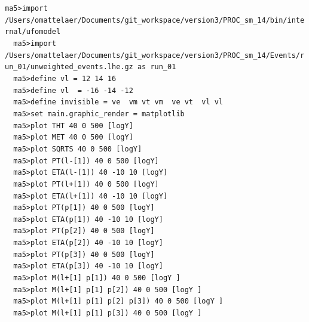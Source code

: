 \documentclass[a4paper, 10pt]{article}
\begin{document}
\texttt{ma5>import /\-Users/\-omattelaer/\-Documents/\-git\_workspace/\-version3/\-PROC\_sm\_14/\-bin/\-internal/\-ufomodel\\
}
\texttt{ }\texttt{ }\texttt{ma5>import /\-Users/\-omattelaer/\-Documents/\-git\_workspace/\-version3/\-PROC\_sm\_14/\-Events/\-run\_01/\-unweighted\_events.lhe.gz as run\_01\\
}
\texttt{ }\texttt{ }\texttt{ma5>define vl = 12 14 16\\
}
\texttt{ }\texttt{ }\texttt{ma5>define vl~ = -16 -14 -12\\
}
\texttt{ }\texttt{ }\texttt{ma5>define invisible = ve~ vm vt vm~ ve vt~ vl vl~\\
}
\texttt{ }\texttt{ }\texttt{ma5>set main.graphic\_render = matplotlib\\
}
\texttt{ }\texttt{ }\texttt{ma5>plot THT   40 0 500 [logY]\\
}
\texttt{ }\texttt{ }\texttt{ma5>plot MET   40 0 500 [logY]\\
}
\texttt{ }\texttt{ }\texttt{ma5>plot SQRTS 40 0 500 [logY]\\
}
\texttt{ }\texttt{ }\texttt{ma5>plot  PT(l-[1]) 40 0  500 [logY]\\
}
\texttt{ }\texttt{ }\texttt{ma5>plot ETA(l-[1]) 40 -10 10 [logY]\\
}
\texttt{ }\texttt{ }\texttt{ma5>plot  PT(l+[1]) 40 0  500 [logY]\\
}
\texttt{ }\texttt{ }\texttt{ma5>plot ETA(l+[1]) 40 -10 10 [logY]\\
}
\texttt{ }\texttt{ }\texttt{ma5>plot  PT(p[1]) 40 0  500 [logY]\\
}
\texttt{ }\texttt{ }\texttt{ma5>plot ETA(p[1]) 40 -10 10 [logY]\\
}
\texttt{ }\texttt{ }\texttt{ma5>plot  PT(p[2]) 40 0  500 [logY]\\
}
\texttt{ }\texttt{ }\texttt{ma5>plot ETA(p[2]) 40 -10 10 [logY]\\
}
\texttt{ }\texttt{ }\texttt{ma5>plot  PT(p[3]) 40 0  500 [logY]\\
}
\texttt{ }\texttt{ }\texttt{ma5>plot ETA(p[3]) 40 -10 10 [logY]\\
}
\texttt{ }\texttt{ }\texttt{ma5>plot M(l+[1] p[1]) 40 0  500 [logY ]\\
}
\texttt{ }\texttt{ }\texttt{ma5>plot M(l+[1] p[1] p[2]) 40 0  500 [logY ]\\
}
\texttt{ }\texttt{ }\texttt{ma5>plot M(l+[1] p[1] p[2] p[3]) 40 0  500 [logY ]\\
}
\texttt{ }\texttt{ }\texttt{ma5>plot M(l+[1] p[1] p[3]) 40 0  500 [logY ]\\
}
\end{document}

